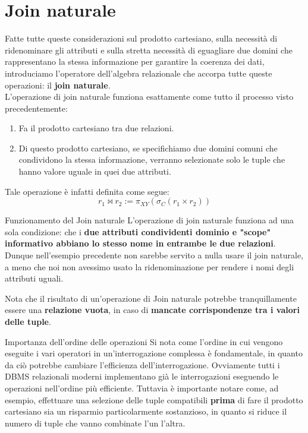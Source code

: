 \documentclass[12pt]{report}
\begin{document}
	\section{Join naturale}
	Fatte tutte queste considerazioni sul prodotto cartesiano, sulla necessità di ridenominare gli attributi e sulla stretta necessità di eguagliare due domini che rappresentano la stessa informazione per garantire la coerenza dei dati, introduciamo l'operatore dell'algebra relazionale che accorpa tutte queste operazioni: il \textbf{join naturale}.\\
	L'operazione di join naturale funziona esattamente come tutto il processo visto precedentemente:
	\begin{enumerate}
		\item Fa il prodotto cartesiano tra due relazioni.
		\item Di questo prodotto cartesiano, se specifichiamo due domini comuni che condividono la stessa informazione, verranno selezionate solo le tuple che hanno valore uguale in quei due attributi.
	\end{enumerate}
	Tale operazione è infatti definita come segue:
	\[
		r_1 \bowtie r_2 := \pi_{XY}(\sigma_C(r_1 \times r_2))
	\]
	\begin{osservazione}{Funzionamento del Join naturale}{}
		L'operazione di join naturale funziona ad una sola condizione: che i \textbf{due attributi condividenti dominio e "scope" informativo abbiano lo stesso nome in entrambe le due relazioni}. Dunque nell'esempio precedente non sarebbe servito a nulla usare il join naturale, a meno che noi non avessimo usato la ridenominazione per rendere i nomi degli attributi uguali.
		\smallbreak
		
		Nota che il risultato di un'operazione di Join naturale potrebbe tranquillamente essere una \textbf{relazione vuota}, in caso di \textbf{mancate corrispondenze tra i valori delle tuple}.
	\end{osservazione}
	
	\begin{osservazione}{Importanza dell'ordine delle operazioni}{}
		Si nota come l'ordine in cui vengono eseguite i vari operatori in un'interrogazione complessa è fondamentale, in quanto da ciò potrebbe cambiare l'efficienza dell'interrogazione. Ovviamente tutti i DBMS relazionali moderni implementano già le interrogazioni eseguendo le operazioni nell'ordine più efficiente. Tuttavia è importante notare come, ad esempio, effettuare una selezione delle tuple compatibili \textbf{prima} di fare il prodotto cartesiano sia un risparmio particolarmente sostanzioso, in quanto si riduce il numero di tuple che vanno combinate l'un l'altra.
	\end{osservazione}
	
\end{document}
